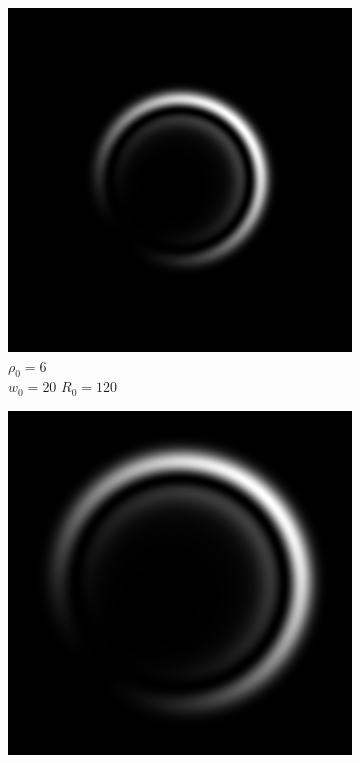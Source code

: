 \documentclass[11pt, a4paper, twoside]{article} %
\begin{document}
\begin{figure}[h!]
\begin{subfigure}[b]{0.245\linewidth}
     \includegraphics[width=\linewidth]{simul32.png}
    \caption{$\rho_0=6$\\ $w_0=20$ $R_0=120$}
     \end{subfigure}
 \begin{subfigure}[b]{0.245\linewidth}
     \includegraphics[width=\linewidth]{simul33.png}

\end{subfigure}
\end{figure}
\end{document}
